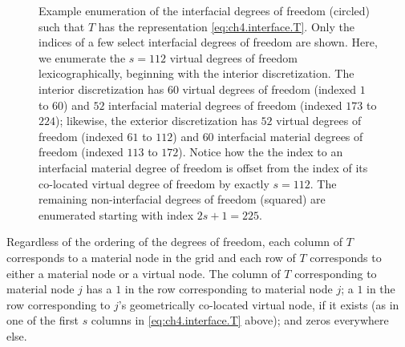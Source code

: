 \setlength{\figurewidth}{0.50\textwidth}
\begin{figure}[htbp]
\centering
{}
\caption{Example enumeration of the interfacial degrees of freedom (circled) such that $T$ has the representation \eqref{eq:ch4.interface.T}. Only the indices of a few select interfacial degrees of freedom are shown. Here, we enumerate the $s = 112$ virtual degrees of freedom lexicographically, beginning with the interior discretization. The interior discretization has $60$ virtual degrees of freedom (indexed $1$ to $60$) and $52$ interfacial material degrees of freedom (indexed $173$ to $224$); likewise, the exterior discretization has $52$ virtual degrees of freedom (indexed $61$ to $112$) and $60$ interfacial material degrees of freedom (indexed $113$ to $172$). Notice how the the index to an interfacial material degree of freedom is offset from the index of its co-located virtual degree of freedom by exactly $s = 112$. The remaining non-interfacial degrees of freedom (squared) are enumerated starting with index $2s + 1 = 225$.}
\label{fig:ch4.dofenumerationforT}
\end{figure}

Regardless of the ordering of the degrees of freedom, each column of $T$ corresponds to a material node in the grid and each row of $T$ corresponds to either a material node or a virtual node. The column of $T$ corresponding to material node $j$ has a $1$ in the row corresponding to material node $j$; a $1$ in the row corresponding to $j$'s geometrically co-located virtual node, if it exists (as in one of the first $s$ columns in \eqref{eq:ch4.interface.T} above); and zeros everywhere else.

